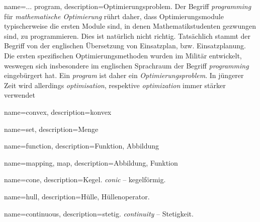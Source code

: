 {
  name=$\ldots$ program,
  description={Optimierungsproblem.
        Der Begriff \emph{programming} f\"ur \emph{mathematische Optimierung} r\"uhrt daher, dass Optimierungsmodule typischerweise die ersten Module sind, in denen Mathematikstudenten gezwungen sind, zu programmieren.
        Dies ist nat\"urlich nicht richtig.
        Tats\"achlich stammt der Begriff von der englischen \"Ubersetzung von Einsatzplan, bzw. Einsatzplanung.
        Die ersten spezifischen Optimierungsmethoden wurden im Milit\"ar entwickelt, weswegen sich insbesondere im englischen Sprachraum der Begriff \emph{programming} eingeb\"urgert hat.
        Ein \emph{program} ist daher ein \emph{Optimierungsproblem}.
        In j\"ungerer Zeit wird allerdings \emph{optimisation}, respektive \emph{optimization} immer st\"arker verwendet}
}

{
  name=convex,
  description={konvex}
}

{
  name=set,
  description={Menge}
}

{
  name=function,
  description={Funktion, Abbildung}
}

{
  name={mapping, map},
  description={Abbildung, Funktion}
}

{
  name=cone,
  description={Kegel. \textsl{conic} -- kegelförmig.}
}

{
  name=hull,
  description={H\"ulle, H\"ullenoperator.}
}

{
  name=continuous,
  description={stetig. \emph{continuity} -- Stetigkeit.}
}

\glsaddall
\printglossary[title=Optimisational English]
